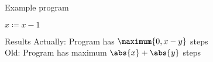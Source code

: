 \begin{block}{Example program}
  \begin{algorithmic}
    \State $x \coloneqq x - 1$
    \EndWhile
  \end{algorithmic}
\end{block}
\begin{block}{Results}
  Actually: Program has $\maximum{0,x-y}$ steps \\
  Old: Program has maximum $\abs{x}+\abs{y}$ steps
\end{block}
  

